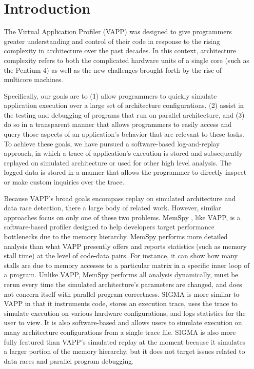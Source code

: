 \section{Introduction}
The Virtual Application Profiler (VAPP) was designed to give programmers
greater understanding and control of their code in response to
the rising complexity in architecture over the past decades.
In this context, architecture complexity refers to both the
complicated hardware units of a single core (such as the Pentium 4)
as well as the new challenges brought forth by the rise of
multicore machines.

Specifically, our goals are to (1) allow programmers to quickly
simulate application execution over a large set of architecture
configurations, (2) assist in the testing and debugging of
programs that run on parallel architecture, and (3) do so in a
transparent manner that allows programmers to easily access and
query those aspects of an application's behavior that are relevant to
these tasks.  To achieve these goals, we have pursued a software-based
log-and-replay approach, in which a trace of application's execution
is stored and subsequently replayed on simulated architecture or
used for other high level analysis.  The logged data is stored
in a manner that allows the programmer to directly inspect or
make custom inquiries over the trace.

Because VAPP's broad goals encompass replay on simulated architecture
and data race detection, there a large body of related work.
However, similar approaches focus on only one of these two problems.
MemSpy \cite{martonosi1992memspy}, like VAPP, is a software-based
profiler designed to help developers target performance bottlenecks 
due to the memory hierarchy.  MemSpy performs more detailed analysis
than what VAPP presently offers and reports statistics (such as
memory stall time) at the level of code-data pairs.  For instance,
it can show how many stalls are due to memory accesses to a particular
matrix in a specific inner loop of a program.  Unlike VAPP, MemSpy
performs all analysis dynamically, must be rerun every time
the simulated architecture's parameters are changed, and does not
concern itself with parallel program correctness.
SIGMA \cite{derose2002sigma} is more similar to VAPP in that it
instruments code, stores an execution trace, uses the trace
to simulate execution on various hardware configurations, and
logs statistics for the user to view.  It is also software-based
and allows users to simulate execution on many architecture
configurations from a single trace file.  SIGMA is also more
fully featured than VAPP's simulated replay at the moment because it simulates
a larger portion of the memory hierarchy, but it does not target
issues related to data races and parallel program debugging.

